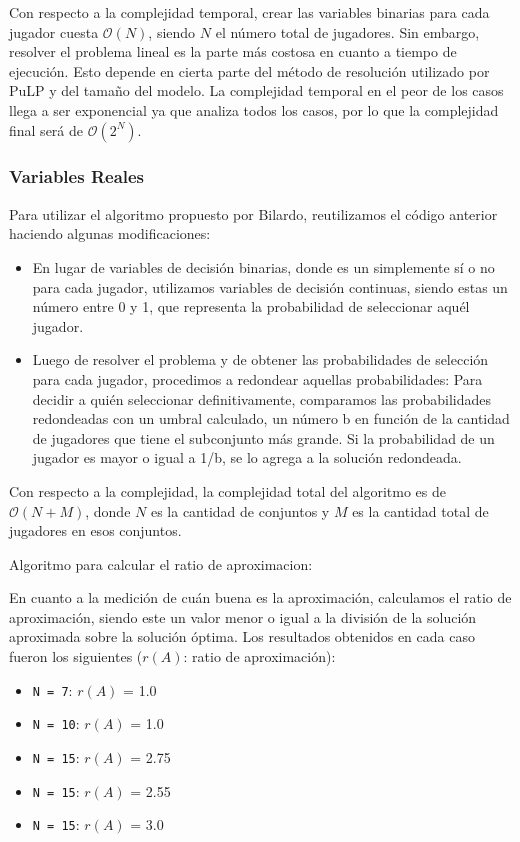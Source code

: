 Con respecto a la complejidad temporal, crear las variables binarias para cada jugador cuesta $\mathcal{O}(N)$, siendo $N$ el número total de jugadores. Sin embargo, resolver el problema lineal es la parte más costosa en cuanto a tiempo de ejecución. Esto depende en cierta parte del método de resolución utilizado por PuLP y del tamaño del modelo. La complejidad temporal en el peor de los casos llega a ser exponencial ya que analiza todos los casos, por lo que la complejidad final será de $\mathcal{O}(2^N)$.

\subsubsection{Variables Reales}



Para utilizar el algoritmo propuesto por Bilardo, reutilizamos el código anterior haciendo algunas modificaciones:
\begin{itemize}
	\item En lugar de variables de decisión binarias, donde es un simplemente sí o no para cada jugador, utilizamos variables de decisión continuas, siendo estas un número entre 0 y 1, que representa la probabilidad de seleccionar aquél jugador.
	\item Luego de resolver el problema y de obtener las probabilidades de selección para cada jugador, procedimos a redondear aquellas probabilidades:
    	Para decidir a quién seleccionar definitivamente, comparamos las probabilidades redondeadas con un umbral calculado, un número b en función de la cantidad de jugadores que tiene el subconjunto más grande.
	Si la probabilidad de un jugador es mayor o igual a 1/b, se lo agrega a la solución redondeada.
\end{itemize}

Con respecto a la complejidad, la complejidad total del algoritmo es de $\mathcal{O}(N+M)$, donde $N$ es la cantidad de conjuntos y $M$ es la cantidad total de jugadores en esos conjuntos.

Algoritmo para calcular el ratio de aproximacion:



En cuanto a la medición de cuán buena es la aproximación, calculamos el ratio de aproximación, siendo este un valor menor o igual a la división de la solución aproximada sobre la solución óptima. Los resultados obtenidos en cada caso fueron los siguientes ($r(A)$: ratio de aproximación):
\begin{itemize}
	\item \texttt{N = 7}: $r(A)$ = 1.0
	\item \texttt{N = 10}: $r(A)$ = 1.0
	\item \texttt{N = 15}: $r(A)$ = 2.75
	\item \texttt{N = 15}: $r(A)$ = 2.55
	\item \texttt{N = 15}: $r(A)$ = 3.0
\end{itemize}


